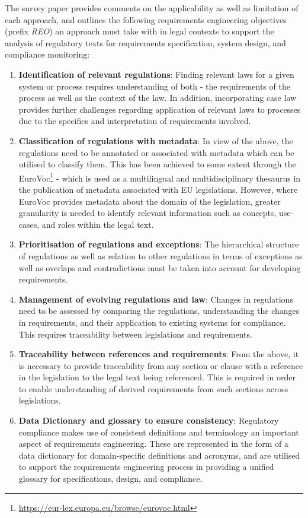 The survey paper provides comments on the applicability as well as limitation of each approach, and  outlines the following requirements engineering objectives (prefix \textit{REO}) an approach must take with in legal contexts to support the analysis of regulatory texts for requirements specification, system design, and compliance monitoring:
\begin{enumerate}[label={\textit{REO.\theenumi}}]
    \item \textbf{Identification of relevant regulations}: Finding relevant laws for a given system or process requires understanding of both - the requirements of the process as well as the context of the law. In addition, incorporating case law provides further challenges regarding application of relevant laws to processes due to the specifics and interpretation of requirements involved.
    \item \textbf{Classification of regulations with metadata}: In view of the above, the regulations need to be annotated or associated with metadata which can be utilised to classify them. This has been achieved to some extent through the EuroVoc\footnote{\url{https://eur-lex.europa.eu/browse/eurovoc.html}} - which is used as a multilingual and multidisciplinary thesaurus in the publication of metadata associated with EU legislations. However, where EuroVoc provides metadata about the domain of the legislation, greater granularity is needed to identify relevant information such as concepts, use-cases, and roles within the legal text.
    \item \textbf{Prioritisation of regulations and exceptions}: The hierarchical structure of regulations as well as relation to other regulations in terms of exceptions as well as overlaps and contradictions  must be taken into account for developing requirements.
    \item \textbf{Management of evolving regulations and law}: Changes in regulations need to be assessed by comparing the regulations, understanding the changes in requirements, and their application to existing systems for compliance. This requires traceability between legislations and requirements.
    \item \textbf{Traceability between references and requirements}: From the above, it is necessary to provide traceability from any section or clause with a reference in the legislation to the legal text being referenced. This is required in order to enable understanding of derived requirements from such sections across legislations.
    \item \textbf{Data Dictionary and glossary to ensure consistency}: Regulatory compliance makes use of consistent definitions and terminology an important aspect of requirements engineering. These are represented in the form of a data dictionary for domain-specific definitions and acronyms, and are utilised to support the requirements engineering process in providing a unified glossary for specifications, design, and compliance. 

\end{enumerate}
